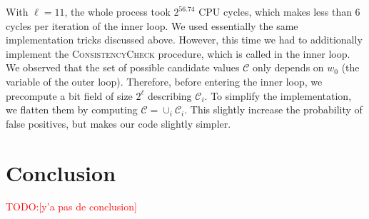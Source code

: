 \documentclass[submission,svgnames,journal=tosc]{iacrtrans}
\newcommand{\todo}[1]{\textcolor{red}{TODO:[#1]}}
\begin{document}
With $\ell=11$, the whole process took $2^{56.74}$ CPU cycles, which makes less
than 6 cycles per iteration of the inner loop. We used essentially the same
implementation tricks discussed above. However, this time we had to additionally
implement the \textsc{ConsistencyCheck} procedure, which is called in the inner
loop. We observed that the set of possible candidate values $\mathcal{C}$ only
depends on $w_0$ (the variable of the outer loop). Therefore, before entering
the inner loop, we precompute a bit field of size $2^\ell$ describing
$\mathcal{C}_i$. To simplify the implementation, we flatten them by computing
$\mathcal{C} = \cup_i \mathcal{C}_i$. This slightly increase the probability of
false positives, but makes our code slightly simpler.

\section{Conclusion}
\todo{y'a pas de conclusion}




\end{document}
